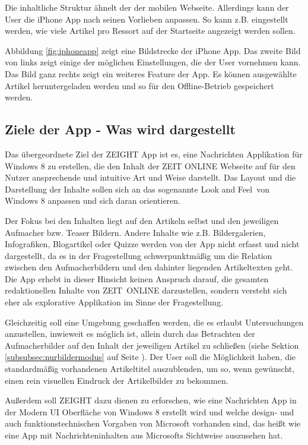 \documentclass[12pt,a4paper,bibtotoc,abstracton]{scrartcl}
\begin{document}
Die inhaltliche Struktur ähnelt der der mobilen Webseite. Allerdings kann der User die iPhone App nach seinen Vorlieben anpassen. So kann z.B. eingestellt werden, wie viele Artikel pro Ressort auf der Startseite angezeigt werden sollen.

Abbildung \ref{fig:iphoneapp} zeigt eine Bildstrecke der iPhone App. Das zweite Bild von links zeigt einige der möglichen Einstellungen, die der User vornehmen kann. Das Bild ganz rechts zeigt ein weiteres Feature der App. Es können ausgewählte Artikel heruntergeladen werden und so für den Offline-Betrieb gespeichert werden.

\subsection{Ziele der App - Was wird dargestellt}
\label{subsec:zielderapp}
Das übergeordnete Ziel der ZEIGHT App ist es, eine Nachrichten Applikation für Windows 8 zu erstellen, die den Inhalt der ZEIT ONLINE Webseite auf für den Nutzer ansprechende und intuitive Art und Weise darstellt. Das Layout und die Darstellung der Inhalte sollen sich an das sogenannte \glqq Look and Feel\grqq\ von Windows 8 anpassen und sich daran orientieren.

Der Fokus bei den Inhalten liegt auf den Artikeln selbst und den jeweiligen Aufmacher bzw. Teaser Bildern. Andere Inhalte wie z.B. Bildergalerien, Infografiken, Blogartikel oder Quizze werden von der App nicht erfasst und nicht dargestellt, da es in der Fragestellung schwerpunktmäßig um die Relation zwischen den Aufmacherbildern und den dahinter liegenden Artikeltexten geht. Die App erhebt in dieser Hinsicht keinen Anspruch darauf, die gesamten redaktionellen Inhalte von \mbox{ZEIT ONLINE} darzustellen, sondern versteht sich eher als explorative Applikation im Sinne der Fragestellung.

Gleichzeitig soll eine Umgebung geschaffen werden, die es erlaubt Untersuchungen anzustellen, inwieweit es möglich ist, allein durch das Betrachten der Aufmacherbilder auf den Inhalt der jeweiligen Artikel zu schließen (siehe Sektion \ref{subsubsec:nurbildermodus} auf Seite \pageref{subsubsec:nurbildermodus}). Der User soll die Möglichkeit haben, die standardmäßig vorhandenen Artikeltitel auszublenden, um so, wenn gewünscht, einen rein visuellen Eindruck der Artikelbilder zu bekommen.

Außerdem soll ZEIGHT dazu dienen zu erforschen, wie eine Nachrichten App in der Modern UI Oberfläche von Windows 8 erstellt wird und welche design- und auch funktionstechnischen Vorgaben von Microsoft vorhanden sind, das heißt wie eine App mit Nachrichteninhalten aus Microsofts Sichtweise auszusehen hat.
\end{document}
